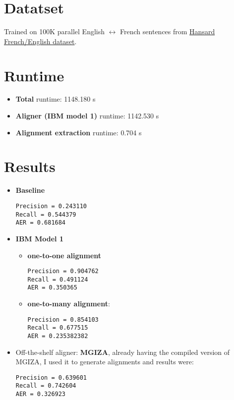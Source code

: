 \documentclass{article}[a4paper]
\begin{document}
\section{Datatset}
Trained on 100K parallel English $\leftrightarrow$ French sentences from \href{https://catalog.ldc.upenn.edu/LDC95T20}{Hansard French/English dataset}.

\section{Runtime}
\begin{itemize}
    \item \textbf{Total} runtime: 1148.180 s
    \item \textbf{Aligner (IBM model 1)} runtime: 1142.530 s
    \item \textbf{Alignment extraction} runtime: 0.704 s
\end{itemize}

\section{Results}
\begin{itemize}
    \item \textbf{Baseline}
        \begin{Verbatim}
Precision = 0.243110
Recall = 0.544379
AER = 0.681684
        \end{Verbatim}
    \item \textbf{IBM Model 1}
        \begin{itemize}
        \item \textbf{one-to-one alignment}
            \begin{Verbatim}
Precision = 0.904762
Recall = 0.491124
AER = 0.350365
            \end{Verbatim}
        \item \textbf{one-to-many alignment}: 
            \begin{Verbatim}
Precision = 0.854103
Recall = 0.677515
AER = 0.235382382
            \end{Verbatim}
        \end{itemize}
    \item Off-the-shelf aligner: \textbf{MGIZA}, already having the compiled version of MGIZA, I used it to generate alignments and results  were:
    \begin{Verbatim}
Precision = 0.639601
Recall = 0.742604
AER = 0.326923
    \end{Verbatim}
    
\end{itemize}
\end{document}
